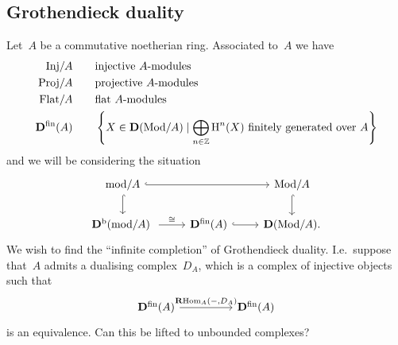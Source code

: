 \documentclass[10pt,a4paper]{article}
\begin{document}
\subsection{Grothendieck duality}
Let~$A$ be a commutative noetherian ring. Associated to~$A$ we have
\begin{equation}
  \begin{aligned}
    \Inj/A & \qquad\text{injective $A$-modules} \\
    \mathrm{Proj}/A & \qquad\text{projective $A$-modules} \\
    \Flat/A & \qquad\text{flat $A$-modules} \\
    \derived^\fin(A) & \qquad\left\{ X\in\derived(\Mod/A)\mid\bigoplus_{n\in\mathbb{Z}}\HH^n(X)\text{ finitely generated over $A$} \right\}
  \end{aligned}
\end{equation}
and we will be considering the situation
\begin{equation}
  \begin{tikzcd}
    \mathrm{mod}/A \arrow[hook]{d} \arrow[hook]{rr} & & \Mod/A \arrow[hook]{d} \\
    \derived^\bounded(\mathrm{mod}/A) \arrow{r}{\cong} & \derived^\fin(A) \arrow[hook]{r} & \derived(\Mod/A).
  \end{tikzcd}
\end{equation}
We wish to find the ``infinite completion'' of Grothendieck duality. I.e.\ suppose that~$A$ admits a dualising complex~$D_A$, which is a complex of injective objects such that
\begin{equation}
  \begin{tikzcd}[column sep = huge]
    \derived^\fin(A) \arrow{r}{\RRRHom_A(-,D_A)} & \derived^\fin(A)
  \end{tikzcd}
\end{equation}
is an equivalence. Can this be lifted to unbounded complexes?
\end{document}

